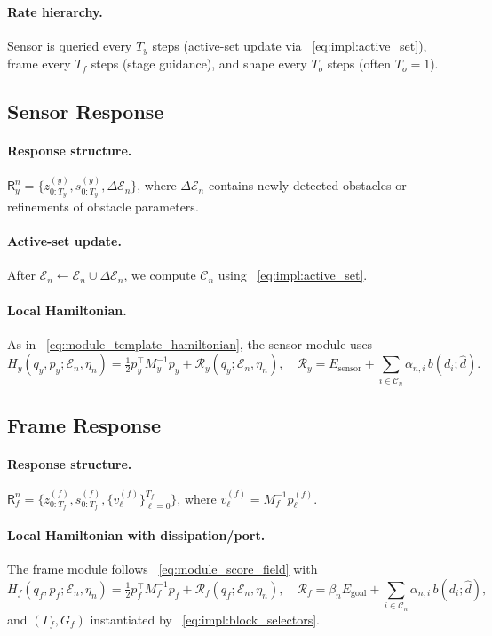 \paragraph{Rate hierarchy.}
Sensor is queried every $T_y$ steps (active-set update via ~\cref{eq:impl:active_set}),
frame every $T_f$ steps (stage guidance), and shape every $T_o$ steps (often $T_o{=}1$).

\subsection{Sensor Response}
\label{subsec:sensor_response}

\paragraph{Response structure.}
$\mathsf{R}_y^n=\{z_{0:T_y}^{(y)},s_{0:T_y}^{(y)},\Delta\mathcal{E}_n\}$, where $\Delta\mathcal{E}_n$ contains newly detected obstacles
or refinements of obstacle parameters.

\paragraph{Active-set update.}
After $\mathcal{E}_n \leftarrow \mathcal{E}_n\cup\Delta\mathcal{E}_n$, we compute $\mathcal{C}_n$ using ~\cref{eq:impl:active_set}.

\paragraph{Local Hamiltonian.}
As in ~\cref{eq:module_template_hamiltonian}, the sensor module uses
\[
H_y(q_y,p_y;\mathcal{E}_n,\eta_n)
=\tfrac12 p_y^\top M_y^{-1}p_y+\mathcal{R}_y(q_y;\mathcal{E}_n,\eta_n),
\quad
\mathcal{R}_y=E_{\mathrm{sensor}}+\sum_{i\in\mathcal{C}_n}\alpha_{n,i}\,b(d_i;\hat d).
\]

\subsection{Frame Response}
\label{subsec:frame_response}

\paragraph{Response structure.}
$\mathsf{R}_f^n=\{z_{0:T_f}^{(f)},s_{0:T_f}^{(f)},\{v_\ell^{(f)}\}_{\ell=0}^{T_f}\}$, where $v_\ell^{(f)}=M_f^{-1}p_\ell^{(f)}$.

\paragraph{Local Hamiltonian with dissipation/port.}
The frame module follows ~\cref{eq:module_score_field} with
\[
H_f(q_f,p_f;\mathcal{E}_n,\eta_n)
=\tfrac12 p_f^\top M_f^{-1}p_f+\mathcal{R}_f(q_f;\mathcal{E}_n,\eta_n),
\quad
\mathcal{R}_f=\beta_n E_{\mathrm{goal}}+\sum_{i\in\mathcal{C}_n}\alpha_{n,i}\,b(d_i;\hat d),
\]
and $(\Gamma_f,G_f)$ instantiated by ~\cref{eq:impl:block_selectors}.

